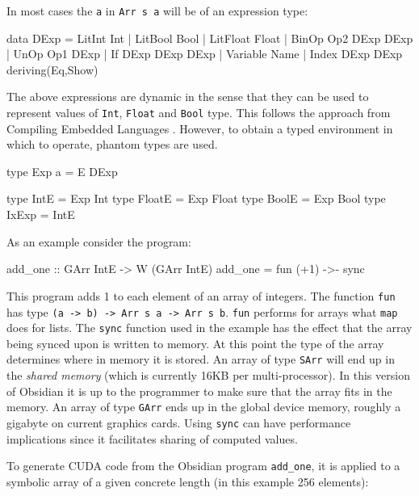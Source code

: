 In most cases the {\tt a} in {\tt Arr s a} will be of an expression type: 
\begin{code} 
data DExp = LitInt Int
          | LitBool Bool
          | LitFloat Float 
          | BinOp Op2 DExp DExp 
          | UnOp  Op1 DExp 
          | If DExp DExp DExp 
          | Variable Name 
          | Index DExp DExp  
            deriving(Eq,Show)
\end{code} 

The above expressions are dynamic in the sense that they can be used to 
represent values of {\tt Int}, {\tt Float} and {\tt Bool} type. 
This follows the approach from Compiling Embedded Languages 
. However, 
to obtain a typed environment in which to operate, phantom types are used. 

\begin{code} 
type Exp a = E DExp

type IntE   = Exp Int
type FloatE = Exp Float
type BoolE  = Exp Bool
type IxExp  = IntE 
\end{code}

As an example consider the program: 
\begin{code} 
add_one :: GArr IntE -> W (GArr IntE)
add_one = fun (+1) ->- sync
\end{code} 
This program adds 1 to each element of an array of integers. The function {\tt fun}
has type {\tt (a -> b) -> Arr s a -> Arr s b}. {\tt fun} performs for arrays what 
{\tt map} does for lists. 
The {\tt sync} function used in the example has the effect that
the array being synced upon is written to memory. At this point the type of 
the array determines where in memory it is stored. An array of type {\tt SArr} 
will end up in the {\em shared memory} (which is currently 16KB per multi-processor). 
In this version of Obsidian it is up to the programmer to make sure that the 
array fits in the memory. An array of type  {\tt GArr} ends up in the global 
device memory, roughly a gigabyte on current graphics cards.  Using {\tt sync} 
can have performance implications since it facilitates sharing of computed 
values. 

To generate CUDA code from the Obsidian program {\tt add\_one}, it is applied to
a symbolic array of a given concrete length (in this example 256 elements): 

